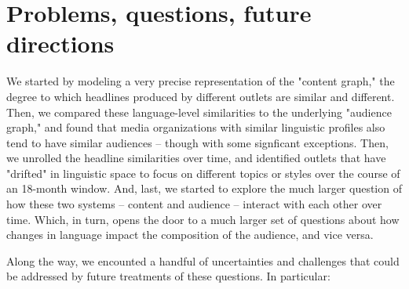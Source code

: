 \documentclass{scrartcl}
\begin{document}
\section{Problems, questions, future directions}

We started by modeling a very precise representation of the "content graph," the degree to which headlines produced by different outlets are similar and different. Then, we compared these language-level similarities to the underlying "audience graph," and found that media organizations with similar linguistic profiles also tend to have similar audiences -- though with some signficant exceptions. Then, we unrolled the headline similarities over time, and identified outlets that have "drifted" in linguistic space to focus on different topics or styles over the course of an 18-month window. And, last, we started to explore the much larger question of how these two systems -- content and audience -- interact with each other over time. Which, in turn, opens the door to a much larger set of questions about how changes in language impact the composition of the audience, and vice versa.

Along the way, we encounted a handful of uncertainties and challenges that could be addressed by future treatments of these questions. In particular:
\end{document}
